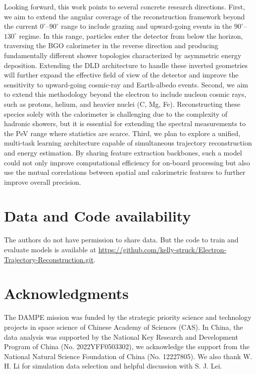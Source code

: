 \documentclass[preprint,12pt]{elsarticle}
\begin{document}
Looking forward, this work points to several concrete research directions. First, we aim to extend the angular coverage of the reconstruction framework beyond the current $0^{\circ}$--$90^{\circ}$ range to include grazing and upward-going events in the $90^{\circ}$--$130^{\circ}$ regime. In this range, particles enter the detector from below the horizon, traversing the BGO calorimeter in the reverse direction and producing fundamentally different shower topologies characterized by asymmetric energy deposition. Extending the DLD architecture to handle these inverted geometries will further expand the effective field of view of the detector and improve the sensitivity to upward-going cosmic-ray and Earth-albedo events. Second, we aim to extend this methodology beyond the electron to include nucleon cosmic rays, such as protons, helium, and heavier nuclei (C, Mg, Fe). Reconstructing these species solely with the calorimeter is challenging due to the complexity of hadronic showers, but it is essential for extending the spectral measurements to the PeV range where statistics are scarce. Third, we plan to explore a unified, multi-task learning architecture capable of simultaneous trajectory reconstruction and energy estimation. By sharing feature extraction backbones, such a model could not only improve computational efficiency for on-board processing but also use the mutual correlations between spatial and calorimetric features to further improve overall precision.


\section*{Data and Code availability}
The authors do not have permission to share data. But the code to train and evaluate models is available at \url{https://github.com/kelly-struck/Electron-Trajectory-Reconstruction.git}. 

\section*{Acknowledgments}
The DAMPE mission was funded by the strategic priority science and technology projects in space science of Chinese Academy of Sciences (CAS). In China, the data analysis was supported by the National Key Research and Development Program of China (No. 2022YFF0503302), we acknowledge the support from the National Natural Science Foundation of China (No. 12227805). We also thank W. H. Li for simulation data selection and helpful discussion with S. J. Lei.
\end{document}
